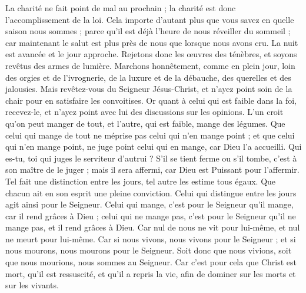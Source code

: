 \begin{multicols}{2}
La charité ne fait point de mal au prochain ; la charité est donc l'accomplissement de la loi.
Cela importe d’autant plus que vous savez en quelle saison nous sommes ; parce qu'il est déjà l’heure de nous réveiller du sommeil ; car maintenant le salut est plus près de nous que lorsque nous avons cru.
La nuit est avancée et le jour approche. Rejetons donc les œuvres des ténèbres, et soyons revêtus des armes de lumière.
Marchons honnêtement, comme en plein jour, loin des orgies et de l’ivrognerie, de la luxure et de la débauche, des querelles et des jalousies.
Mais revêtez-vous du Seigneur Jésus-Christ, et n'ayez point soin de la chair pour en satisfaire les convoitises.
\VerseOne{}Or quant à celui qui est faible dans la foi, recevez-le, et n'ayez point avec lui des discussions sur les opinions.
L'un croit qu'on peut manger de tout, et l'autre, qui est faible, mange des légumes.
Que celui qui mange de tout ne méprise pas celui qui n'en mange point ; et que celui qui n'en mange point, ne juge point celui qui en mange, car Dieu l'a accueilli.
Qui es-tu, toi qui juges le serviteur d'autrui ? S’il se tient ferme ou s'il tombe, c’est à son maître de le juger ; mais il sera affermi, car Dieu est Puissant pour l'affermir.
Tel fait une distinction entre les jours, tel autre les estime tous égaux. Que chacun ait en son esprit une pleine conviction.
Celui qui distingue entre les jours agit ainsi pour le Seigneur. Celui qui mange, c’est pour le Seigneur qu’il mange, car il rend grâces à Dieu ; celui qui ne mange pas, c’est pour le Seigneur qu’il ne mange pas, et il rend grâces à Dieu.
Car nul de nous ne vit pour lui-même, et nul ne meurt pour lui-même.
Car si nous vivons, nous vivons pour le Seigneur ; et si nous mourons, nous mourons pour le Seigneur. Soit donc que nous vivions, soit que nous mourions, nous sommes au Seigneur.
Car c'est pour cela que Christ est mort, qu'il est ressuscité, et qu'il a repris la vie, afin de dominer sur les morts et sur les vivants.

\end{multicols}
